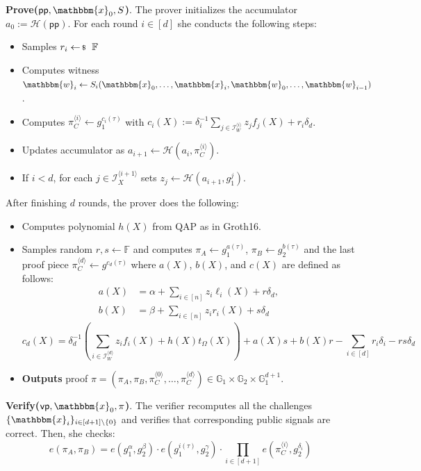 \documentclass[../../book]{subfiles}
\begin{document}
\textbf{Prove($\mathsf{pp},\mathbbm{x}_0,S$)}. The prover initializes the accumulator $a_0 := \mathcal{H}(\mathsf{pp})$. For each round $i \in [d]$ she conducts the following steps:
\begin{itemize}
    \item Samples $r_i \leftarrowS \mathbb{F}$
    \item Computes witness $\mathbbm{w}_i \gets S_i(\mathbbm{x}_0,\dots,\mathbbm{x}_i,\mathbbm{w}_0,\dots,\mathbbm{w}_{i-1})$.
    \item Computes $\pi_C^{\langle i \rangle} \gets g_1^{c_i(\tau)}$ with $c_i(X) := \delta_i^{-1}\sum_{j \in \mathcal{I}_W^{\langle i \rangle}}z_jf_j(X) + r_i\delta_d$.
    \item Updates accumulator as $a_{i+1} \gets \mathcal{H}(a_i,\pi_C^{\langle i \rangle})$.
    \item If $i<d$, for each $j \in \mathcal{I}_X^{\langle i+1 \rangle}$ sets $z_j \gets \mathcal{H}(a_{i+1},g_1^j)$.
\end{itemize}
After finishing $d$ rounds, the prover does the following:
\begin{itemize}
    \item Computes polynomial $h(X)$ from QAP as in Groth16.
    \item Samples random $r,s \gets \mathbb{F}$ and computes $\pi_A \gets g_1^{a(\tau)}$, $\pi_B \gets g_2^{b(\tau)}$ and the last proof piece $\pi_C^{\langle d \rangle} \gets g^{c_d(\tau)}$ where $a(X)$, $b(X)$, and $c(X)$ are defined as follows:
    \begin{align*}
        a(X) &= \alpha + \sum_{i \in [n]} z_i\ell_i(X) + r\delta_d, \\
        b(X) &= \beta + \sum_{i \in [n]}z_ir_i(X) + s\delta_d
    \end{align*}
    \[
    c_d(X) = \delta_d^{-1}\left(\sum_{i \in \mathcal{I}_W^{\langle d \rangle}}z_if_i(X) + h(X)t_{\Omega}(X)\right) + a(X)s+b(X)r-\sum_{i \in [d]}r_i\delta_i - rs\delta_d
    \]
    \item \textbf{Outputs} proof $\pi=(\pi_A,\pi_B,\pi_C^{\langle 0 \rangle}, \dots, \pi_C^{\langle d \rangle}) \in \mathbb{G}_1 \times \mathbb{G}_2 \times \mathbb{G}_1^{d+1}$.
\end{itemize}

\textbf{Verify($\mathsf{vp},\mathbbm{x}_0,\pi$)}. The verifier recomputes all the challenges $\{\mathbbm{x}_i\}_{i \in [d+1] \setminus \{0\}}$ and verifies that corresponding public signals are correct. Then, she checks:
\[
e(\pi_A,\pi_B) = e(g_1^{\alpha},g_2^{\beta}) \cdot e(g_1^{i(\tau)},g_2^{\gamma}) \cdot \prod_{i \in [d+1]}e(\pi_C^{\langle i \rangle}, g_2^{\delta_i})
\]
\end{document}
